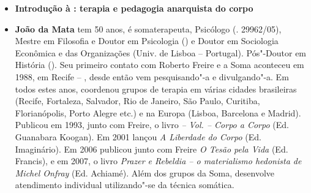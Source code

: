 \begin{itemize}
\item \textbf{Introdução à : terapia e pedagogia anarquista do corpo} \lipsum[1]
  
\item \textbf{João da Mata} tem 50 anos, é somaterapeuta, Psicólogo (. 29962/05), Mestre em Filosofia e Doutor em Psicologia () e Doutor em Sociologia Econômica e das Organizações (Univ. de Lisboa -- Portugal). Pós"-Doutor em História ().
Seu primeiro contato com Roberto Freire e a Soma aconteceu em 1988, em Recife -- , desde então vem pesquisando"-a e divulgando"-a. Em todos estes anos, coordenou grupos de terapia em várias cidades brasileiras
(Recife, Fortaleza, Salvador, Rio de Janeiro, São Paulo, Curitiba, Florianópolis, Porto Alegre etc.) e na Europa (Lisboa, Barcelona e Madrid).
Publicou em 1993, junto com Freire, o livro \emph{ -- Vol.  -- Corpo a Corpo} (Ed. Guanabara Koogan). Em 2001 lançou \emph{A Liberdade do Corpo} (Ed. Imaginário). Em 2006 publicou junto com Freire \emph{O Tesão pela Vida} (Ed. Francis), e em 2007, o livro \emph{Prazer e Rebeldia -- o materialismo hedonista de Michel Onfray} (Ed. Achiamé).
Além dos grupos da Soma, desenvolve atendimento individual utilizando"-se da técnica somática.

\end{itemize}

